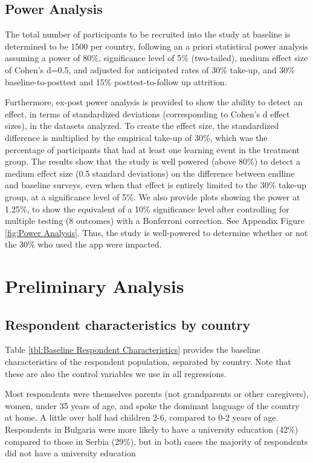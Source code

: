 \subsection{Power Analysis}

The total number of participants to be recruited into the study at baseline is determined to be 1500 per country, following an a priori statistical power analysis assuming a power of 80\%, significance level of 5\% (two-tailed), medium effect size of Cohen’s d=0.5, and adjusted for anticipated rates of 30\% take-up, and 30\% baseline-to-posttest and 15\% posttest-to-follow up attrition.

Furthermore, ex-post power analysis is provided to show the ability to detect an effect, in terms of standardized deviations (corresponding to Cohen’s d effect sizes), in the datasets analyzed. To create the effect size, the standardized difference is multiplied by the empirical take-up of 30\%, which was the percentage of participants that had at least one learning event in the treatment group. The results show that the study is well powered (above 80\%) to detect a medium effect size (0.5 standard deviations) on the difference between endline and baseline surveys, even when that effect is entirely limited to the 30\% take-up group, at a significance level of 5\%. We also provide plots showing the power at 1.25\%, to show the equivalent of a 10\% significance level after controlling for multiple testing (8 outcomes) with a Bonferroni correction. See Appendix Figure \ref{fig:Power Analysis}. Thus, the study is well-powered to determine whether or not the 30\% who used the app were impacted.


\section{Preliminary Analysis}

\subsection{Respondent characteristics by country}

Table \ref{tbl:Baseline Respondent Characteristics} provides the baseline characteristics of the respondent population, separated by country. Note that these are also the control variables we use in all regressions.

Most respondents were themselves parents (not grandparents or other caregivers), women, under 35 years of age, and spoke the dominant language of the country at home. A little over half had children 2-6, compared to 0-2 years of age. Respondents in Bulgaria were more likely to have a university education (42\%) compared to those in Serbia (29\%), but in both cases the majority of respondents did not have a university education

